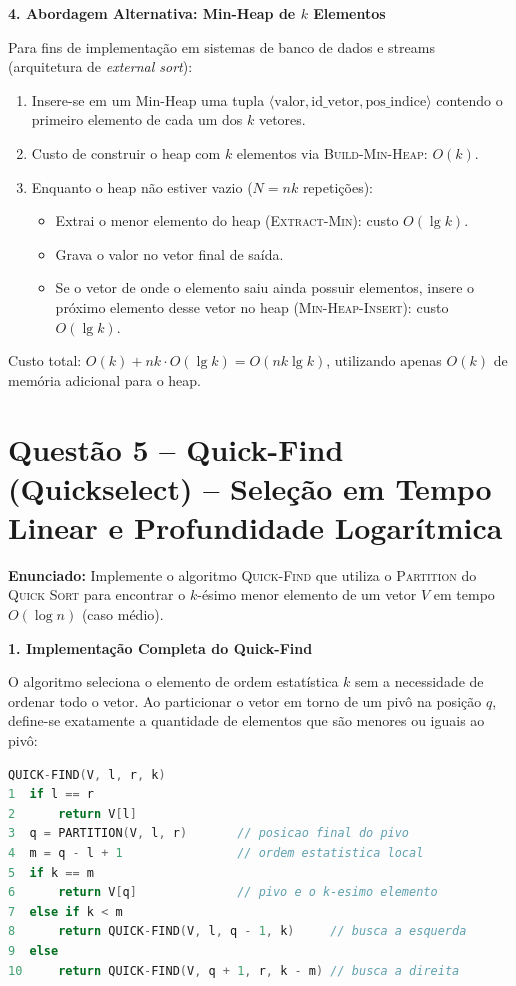 \documentclass[11pt,a4paper]{article}
\newcommand{\topico}[1]{\par\medskip\textbf{\color{azul}#1}\par}
\newcommand{\questao}[2]{\section*{Questão #1 -- #2}}
\begin{document}
\topico{4. Abordagem Alternativa: Min-Heap de $k$ Elementos}
Para fins de implementação em sistemas de banco de dados e streams (arquitetura de \textit{external sort}):
\begin{enumerate}
  \item Insere-se em um Min-Heap uma tupla $\langle \text{valor}, \text{id\_vetor}, \text{pos\_indice} \rangle$ contendo o primeiro elemento de cada um dos $k$ vetores.
  \item Custo de construir o heap com $k$ elementos via \textsc{Build-Min-Heap}: $O(k)$.
  \item Enquanto o heap não estiver vazio ($N = nk$ repetições):
  \begin{itemize}
    \item Extrai o menor elemento do heap (\textsc{Extract-Min}): custo $O(\lg k)$.
    \item Grava o valor no vetor final de saída.
    \item Se o vetor de onde o elemento saiu ainda possuir elementos, insere o próximo elemento desse vetor no heap (\textsc{Min-Heap-Insert}): custo $O(\lg k)$.
  \end{itemize}
\end{enumerate}
Custo total: $O(k) + nk \cdot O(\lg k) = O(nk \lg k)$, utilizando apenas $O(k)$ de memória adicional para o heap.

\newpage
\questao{5}{Quick-Find (Quickselect) -- Seleção em Tempo Linear e Profundidade Logarítmica}

\textbf{Enunciado:} Implemente o algoritmo \textsc{Quick-Find} que utiliza o \textsc{Partition} do \textsc{Quick Sort} para encontrar o $k$-ésimo menor elemento de um vetor $V$ em tempo $O(\log n)$ (caso médio).

\topico{1. Implementação Completa do Quick-Find}
O algoritmo seleciona o elemento de ordem estatística $k$ sem a necessidade de ordenar todo o vetor. Ao particionar o vetor em torno de um pivô na posição $q$, define-se exatamente a quantidade de elementos que são menores ou iguais ao pivô:

\begin{lstlisting}[language=C]
QUICK-FIND(V, l, r, k)
1  if l == r
2      return V[l]
3  q = PARTITION(V, l, r)       // posicao final do pivo
4  m = q - l + 1                // ordem estatistica local
5  if k == m
6      return V[q]              // pivo e o k-esimo elemento
7  else if k < m
8      return QUICK-FIND(V, l, q - 1, k)     // busca a esquerda
9  else
10     return QUICK-FIND(V, q + 1, r, k - m) // busca a direita
\end{lstlisting}
\end{document}
